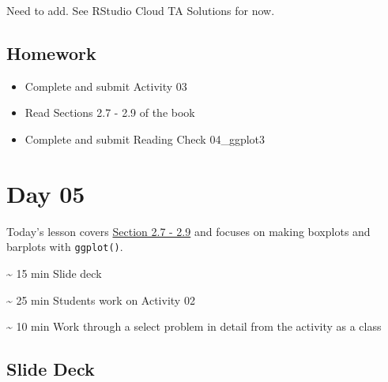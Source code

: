\documentclass[
  letterpaper,
  DIV=11,
  numbers=noendperiod]{scrreprt}
\begin{document}
Need to add. See RStudio Cloud TA Solutions for now.

\hypertarget{homework-3}{%
\section*{Homework}\label{homework-3}}

\begin{itemize}
\item
  Complete and submit Activity 03
\item
  Read Sections 2.7 - 2.9 of the book
\item
  Complete and submit Reading Check 04\_ggplot3
\end{itemize}


\hypertarget{day-05}{%
\chapter*{Day 05}\label{day-05}}

Today's lesson covers
\href{https://nustat.github.io/intro-stat-ds/2-viz.html\#boxplots}{Section
2.7 - 2.9} and focuses on making boxplots and barplots with
\texttt{ggplot()}.

\begin{tcolorbox}[enhanced jigsaw, toptitle=1mm, colback=white, arc=.35mm, rightrule=.15mm, titlerule=0mm, left=2mm, breakable, bottomtitle=1mm, bottomrule=.15mm, leftrule=.75mm, title={Agenda}, colframe=quarto-callout-note-color-frame, opacitybacktitle=0.6, toprule=.15mm, colbacktitle=quarto-callout-note-color!10!white, coltitle=black, opacityback=0]
\textasciitilde{} 15 min Slide deck

\textasciitilde{} 25 min Students work on Activity 02

\textasciitilde{} 10 min Work through a select problem in detail from
the activity as a class
\end{tcolorbox}

\hypertarget{slide-deck-4}{%
\section*{Slide Deck}\label{slide-deck-4}}
\end{document}
